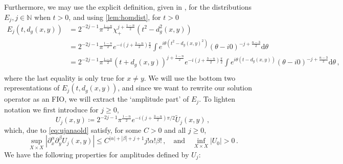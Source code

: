 \documentclass[
	fontsize=11pt, 
	twoside=false, 
	abstract=true, 
	a4paper,
]{scrartcl}
\newcommand{\RR}{\mathbb{R}}
\newcommand{\dd}{\mathrm{d}}
\newcommand{\abs}[1]{\left\lvert#1\right\rvert}
\newcommand{\del}{\partial}
\newcommand{\td}[1]{\tilde{#1}}
\begin{document}
	Furthermore, we may use the explicit definition, given in \cite[Lem.~17.4.2]{hoermander1}, for the distributions $E_j, j\in\mathbb{N}$ when $t>0$, %
	and using \cref{lem:homdist}, for $t>0$
	\begin{equation}\label{eq:rewriteEj}
	\begin{aligned}
		E_j(t,d_g(x,y)) &= 2^{-2j-1}\pi^{\frac{1-n}{2}}\chi_+^{j+\frac{1-n}{2}}(t^2-d_g^2(x,y)) \\
		&= 2^{-2j-1}\pi^{\frac{1-n}{2}} e^{-i\left({j+\frac{3-n}{2}}\right)\frac{\pi}{2}}\int e^{i\theta(t^2-d_g(x,y)^2)} (\theta-i0)^{-j+\frac{n-3}{2}}\dd\theta \\
		&= 2^{-2j-1}\pi^{\frac{1-n}{2}}(t+d_g(x,y))^{j+\frac{1-n}{2}} e^{-i\left({j+\frac{3-n}{2}}\right)\frac{\pi}{2}}\int e^{i\theta(t-d_g(x,y))} (\theta-i0)^{-j+\frac{n-3}{2}}\dd\theta\,,\\%
	\end{aligned}
	\end{equation}
	where the last equality is only true for $x\neq y$. We will use the bottom two representations of $E_j(t,d_g(x,y))$, and since we want to rewrite our solution operator as an FIO, we will extract the `amplitude part' of $E_j$. To lighten notation we first introduce for $j\geq 0$, 
	\begin{equation}\label{eq:defofnewuj}
		U_j(x,y) \coloneqq 2^{-2j-1}\pi^{\frac{1-n}{2}}e^{-i({j+\frac{3-n}{2}})\pi/2}\td{U}_j(x,y)\,,
	\end{equation}
	which, due to \cref{eq:ujanaold} satisfy, for some $C>0$ and all $j\geq 0$,
	\begin{equation}\label{eq:ujana}
		\sup_{X\times X}\abs{\del^\alpha_x\del^\beta_y U_j(x,y)}\leq C^{\abs{\alpha}+\abs{\beta}+j+1}j!\alpha!\beta!\,,\quad\text{and}\quad \inf_{X\times X}\abs{U_0} > 0\,.
	\end{equation}
We have the following properties for amplitudes defined by $U_j$:
\end{document}
